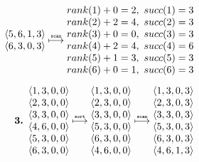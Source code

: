 \begin{align*}
\begin{matrix}
    \langle 5, 6, 1, 3 \rangle \\
    \langle 6, 3, 0, 3 \rangle \\
  \end{matrix}
  \stackrel{\text{\tiny \tt scan}}{\longmapsto}
  \begin{matrix}
    rank(1) + 0 = 2,\ succ(1) = 3 \\
    rank(2) + 2 = 4,\ succ(2) = 3 \\
    rank(3) + 0 = 0,\ succ(3) = 3 \\
    rank(4) + 2 = 4,\ succ(4) = 6 \\
    rank(5) + 1 = 3,\ succ(5) = 3 \\
    rank(6) + 0 = 1,\ succ(6) = 3 \\
  \end{matrix} \\[0.5em]
  \text{\bf 3. }
  \begin{matrix}
    \langle 1, 3, 0, 0 \rangle \\
    \langle 2, 3, 0, 0 \rangle \\
    \langle 3, 3, 0, 0 \rangle \\
    \langle 4, 6, 0, 0 \rangle \\
    \langle 5, 3, 0, 0 \rangle \\
    \langle 6, 3, 0, 0 \rangle \\
  \end{matrix}
  \stackrel{\text{\tiny \tt sort}}{\longmapsto}
  \begin{matrix}
    \langle 1, 3, 0, 0 \rangle \\
    \langle 2, 3, 0, 0 \rangle \\
    \langle 3, 3, 0, 0 \rangle \\
    \langle 5, 3, 0, 0 \rangle \\
    \langle 6, 3, 0, 0 \rangle \\
    \langle 4, 6, 0, 0 \rangle \\
  \end{matrix}
  \stackrel{\text{\tiny \tt scan}}{\longmapsto}
  \begin{matrix}
    \langle 1, 3, 0, 3 \rangle \\
    \langle 2, 3, 0, 3 \rangle \\
    \langle 3, 3, 0, 3 \rangle \\
    \langle 5, 3, 0, 3 \rangle \\
    \langle 6, 3, 0, 3 \rangle \\
    \langle 4, 6, 1, 3 \rangle \\

\end{matrix}
\end{align*}
